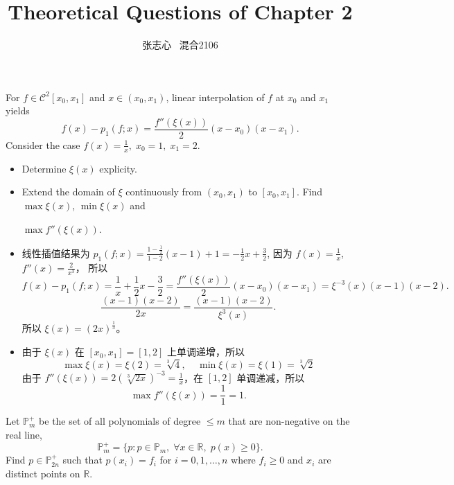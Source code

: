 \documentclass[lang=cn,a4paper,newtx,bibend=bibtex]{elegantpaper}
\title{Theoretical Questions of Chapter 2}
\author{张志心 \ 混合2106}
\date{\zhdate{2023/10/09}}
\begin{document}
\maketitle



\begin{prob}[2.9.1-\textrm{I}.]
For $f\in \mathcal{C}^2[x_0, x_1]$ and $x\in (x_0, x_1)$, linear interpolation of $f$ at $x_0$ and $x_1$
yields
\[
    f(x) - p_1(f; x) = \dfrac{f''(\xi(x))}{2}(x-x_0)(x-x_1).
\]
Consider the case $f(x)=\frac{1}{x},\;x_0=1,\;x_1=2$.
  \begin{itemize}
    \item Determine $\xi(x)$ explicity.
    \item Extend the domain of $\xi$ continuously from $(x_0,x_1)$ to $[x_0,x_1]$. Find $\max \xi(x)$, $\min \xi(x)$ and
    
    $\max f''(\xi(x))$.
  \end{itemize}

\end{prob}

\begin{solution}
\begin{itemize}
\item 线性插值结果为 $p_1(f;x) = \frac{1 - \frac12}{1 - 2}(x - 1) + 1 = -\frac12 x + \frac32$, 因为 $f(x) = \frac1x$, $f''(x) = \frac{2}{x^3}$， 所以
\[f(x) - p_1(f; x) = \frac1x + \frac12 x - \frac32 =  \dfrac{f''(\xi(x))}{2}(x-x_0)(x-x_1)=\xi^{-3}(x)(x-1)(x-2).\]
\[\dfrac{(x-1)(x-2)}{2x} = \frac{(x-1)(x-2)}{\xi^3(x)}.\]
所以 $\xi(x) = (2x)^{\frac13}$。
\item 由于 $\xi(x)$ 在 $[x_0, x_1] = [1, 2]$ 上单调递增，所以
 \[\max \xi(x) = \xi(2) = \sqrt[3]{4}, ~~~~~ \min \xi(x) = \xi(1) = \sqrt[3]{2}\]
 由于 $f''(\xi(x)) = 2\left(\sqrt[3]{2x}\right)^{-3} = \frac1x$，在 $[1, 2]$ 单调递减，所以
 \[\max f''(\xi(x)) = \frac11 = 1.\]
\end{itemize}
\end{solution}

\begin{prob}[2.9.1-\textrm{II}.]
    Let $\mathbb{P}_m^+$ be the set of all polynomials of degree 
    $\leq m$ that are non-negative on the real line,
    \begin{equation*}
      \mathbb{P}_m^+ = \{p:p\in \mathbb{P}_m,\; \forall x\in \mathbb{R}, \; p(x)\geq 0\}.
    \end{equation*}
    Find $p\in \mathbb{P}_{2n}^+$ such that $p(x_i)=f_i$ for $i=0,1,\ldots,n$ where $f_i\ge 0$ 
    and $x_i$ are distinct points on $\mathbb{R}$.  
\end{prob}
\end{document}
